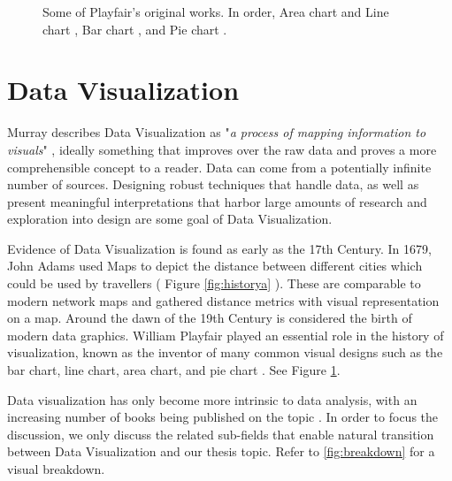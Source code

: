 \begin{figure}[p]
\caption{Some of Playfair's original works. In order, Area chart and Line chart \cite{playfair1801commercial}, Bar chart \cite{playfair1786commercial}, and Pie chart \cite{playfair1801statistical}. }\label{fig:historyb}
\end{figure}

\section{Data Visualization}
Murray describes Data Visualization as "\emph{a process of mapping information to visuals}" \cite{murray2017interactive}, ideally something that improves over the raw data and proves a more comprehensible concept to a reader.
Data can come from a potentially infinite number of sources. Designing robust techniques that handle data, as well as present meaningful interpretations that harbor large amounts of research and exploration into design are some goal of Data Visualization.

Evidence of Data Visualization is found as early as the 17th Century. In 1679, John Adams used Maps to depict the distance between different cities which could be used by travellers \cite{adams1932john} ( Figure \ref{fig:historya} ). These are comparable to modern network maps and gathered distance metrics with visual representation on a map.
Around the dawn of the 19th Century is considered the birth of modern data graphics\cite{friendly2001milestones}. William Playfair played an essential role in the history of visualization, known as the inventor of many common visual designs such as the bar chart, line chart, area chart, and pie chart \cite{playfair1786commercial,playfair1801commercial, playfair1801statistical}. See Figure \ref{fig:historyb}. 

Data visualization has only become more intrinsic to data analysis, with an increasing number of books being published on the topic \cite{rees2019survey}. In order to focus the discussion, we only discuss the related sub-fields that enable natural transition between Data Visualization and our thesis topic. Refer to \ref{fig:breakdown} for a visual breakdown.

